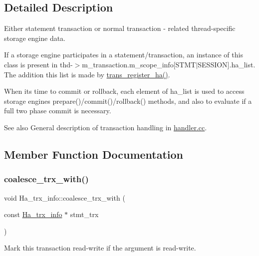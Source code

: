\subsection{Detailed Description}
Either statement transaction or normal transaction -\/ related thread-\/specific storage engine data.

If a storage engine participates in a statement/transaction, an instance of this class is present in thd-\/$>$m\+\_\+transaction.\+m\+\_\+scope\+\_\+info\mbox{[}S\+T\+M\+T$\vert$\+S\+E\+S\+S\+I\+ON\mbox{]}.ha\+\_\+list. The addition this list is made by \mbox{\hyperlink{handler_8cc_a5b334384203039e1f5fc63b69e64d544}{trans\+\_\+register\+\_\+ha()}}.

When it\textquotesingle{}s time to commit or rollback, each element of ha\+\_\+list is used to access storage engine\textquotesingle{}s prepare()/commit()/rollback() methods, and also to evaluate if a full two phase commit is necessary.

\begin{DoxySeeAlso}{See also}
General description of transaction handling in \mbox{\hyperlink{handler_8cc}{handler.\+cc}}. 
\end{DoxySeeAlso}


\subsection{Member Function Documentation}
\mbox{\label{classHa__trx__info_aa529c17a6931145e81ff19abc942a022}} 
\subsubsection{\texorpdfstring{coalesce\+\_\+trx\+\_\+with()}{coalesce\_trx\_with()}}
{\footnotesize\ttfamily void Ha\+\_\+trx\+\_\+info\+::coalesce\+\_\+trx\+\_\+with (\begin{DoxyParamCaption}\item[{const \mbox{\hyperlink{classHa__trx__info}{Ha\+\_\+trx\+\_\+info}} $\ast$}]{stmt\+\_\+trx }\end{DoxyParamCaption})\hspace{0.3cm}{\ttfamily [inline]}}

Mark this transaction read-\/write if the argument is read-\/write. \mbox{\label{classHa__trx__info_a8c9605da42e7b06acb1279fbd95d342a}} 
